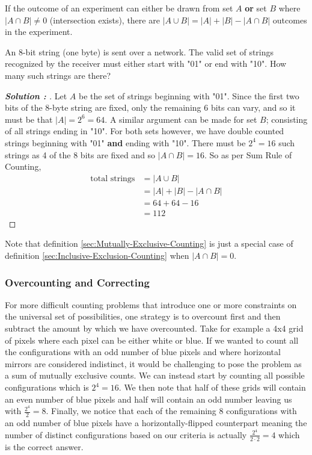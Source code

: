 \documentclass[11pt]{article}
\newenvironment{solution}[1][]{%
  \renewcommand\qedsymbol{$\blacksquare$}%
  \def\temp{\normalfont\bfseries Solution \theexample: #1}
  \begin{proof}[\temp]
  \normalfont %
}{%
  \end{proof}
}
\newcommand{\BF}{\textbf}
\begin{document}
\begin{definition}
    \label{sec:Inclusive-Exclusion-Counting}
    If the outcome of an experiment can either be drawn from set $A$ \BF{or} set $B$ where $|A\cap B| \neq 0$ (intersection exists), there
    are $|A \cup B| = |A| + |B| - |A \cap B|$ outcomes in the experiment.
\end{definition}

\begin{example}
    An 8-bit string (one byte) is sent over a network. The valid set of strings recognized by the receiver must either start with "01" or
    end with "10". How many such strings are there?
\end{example}
\begin{solution}
    Let $A$ be the set of strings beginning with "01". Since the first two bits of the 8-byte string are fixed, only the remaining 6 bits
    can vary, and so it must be that $|A|=2^{6}=64$. A similar argument can be made for set $B$; consisting of all strings ending in "10".
    For both sets however, we have double counted strings beginning with "01" \BF{and} ending with "10". There must be $2^{4} = 16$ such
    strings as 4 of the 8 bits are fixed and so $|A \cap B| = 16$. So as per Sum Rule of Counting,
    \begin{align*}
        \text{total strings} &= |A \cup B|\\
                             &= |A|+|B| - |A \cap B|\\
                             &= 64 + 64 - 16\\
                             &= 112
    \end{align*} 
\end{solution}
Note that definition \ref{sec:Mutually-Exclusive-Counting} is just a special case of definition \ref{sec:Inclusive-Exclusion-Counting} when
$|A \cap B| = 0$.

\subsubsection*{Overcounting and Correcting}
For more difficult counting problems that introduce one or more constraints on the universal set of possibilities, one strategy is to
overcount first and then subtract the amount by which we have overcounted.
Take for example a 4x4 grid of pixels where each pixel can be either white or blue. If we wanted to count all the configurations with an
odd number of blue pixels and where horizontal mirrors are considered indistinct, it would be challenging to pose the problem as a sum of
mutually exclusive counts. We can instead start by counting all possible configurations which is $2^{4} = 16$. We then note that half of
these grids will contain an even number of blue pixels and half will contain an odd number leaving us with $\frac{2^{4}}{2} = 8$. Finally,
we notice that each of the remaining 8 configurations with an odd number of blue pixels have a horizontally-flipped counterpart meaning
the number of distinct configurations based on our criteria is actually $\frac{2^{4}}{2 \cdot 2} = 4$ which is the correct answer.
\newpage
\end{document}
